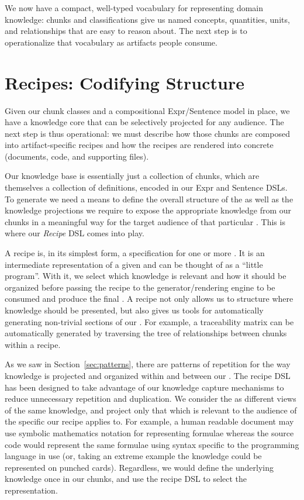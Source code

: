 We now have a compact, well-typed vocabulary for representing domain knowledge: 
chunks and classifications give us named concepts, quantities, units, and 
relationships that are easy to reason about. The next step is to operationalize
that vocabulary as artifacts people consume.

\section{Recipes: Codifying Structure}
\label{sec:recipes}

Given our chunk classes and a compositional Expr/Sentence model in place, we 
have a knowledge core that can be selectively projected for any audience. The 
next step is thus operational: we must describe how those chunks are composed 
into artifact-specific recipes and how the recipes are rendered into concrete 
\sfs{} (documents, code, and supporting files).

Our knowledge base is essentially just a collection of chunks, which are 
themselves a collection of definitions, encoded in our Expr and Sentence DSLs. 
To generate \sfs{} we need a means to define the overall structure of the \sf{} 
as well as the knowledge projections we require to expose the appropriate 
knowledge from our chunks in a meaningful way for the target audience of that 
particular \sf{}. This is where our \emph{Recipe} DSL comes into play.

A recipe is, in its simplest form, a specification for one or more \sfs{}.
It is an intermediate representation of a given \sf{} and can be thought of as 
a ``little program''. With it, we select which knowledge is relevant and how it
should be organized before passing the recipe to the generator/rendering engine 
to be consumed and produce the final \sf{}. A recipe not only allows us to 
structure where knowledge should be presented, but also gives us tools for 
automatically generating non-trivial sections of our \sfs{}. For example, a 
traceability matrix can be automatically generated by traversing the tree of 
relationships between chunks within a recipe. 

As we saw in Section~\ref{sec:patterns}, there are patterns of repetition for 
the way knowledge is projected and organized within and between our \sfs{}. The 
recipe DSL has been designed to take advantage of our knowledge capture 
mechanisms to reduce unnecessary repetition and duplication. We consider the 
\sfs{} as different views of the same knowledge, and project only that which is 
relevant to the audience of the specific \sf{} our recipe applies to. For 
example, a human readable document may use symbolic mathematics notation for 
representing formulae whereas the source code would represent the same formulae 
using syntax specific to the programming language in use (or, taking an extreme 
example the knowledge could be represented on punched cards). Regardless, we 
would define the underlying knowledge once in our chunks, and use the recipe 
DSL to select the representation.

